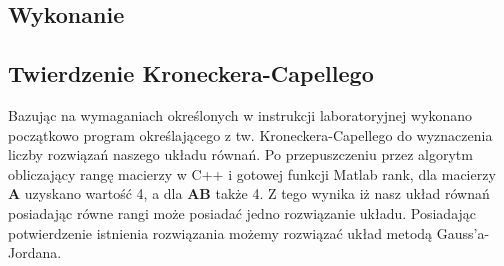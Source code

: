 \documentclass{article}
\begin{document}
\subsection{Wykonanie} 
\subsection{Twierdzenie Kroneckera-Capellego}
Bazując na wymaganiach określonych w instrukcji laboratoryjnej wykonano początkowo program określającego z tw. Kroneckera-Capellego do wyznaczenia liczby rozwiązań naszego układu równań.
Po przepuszczeniu przez algorytm obliczający rangę macierzy w C++ i gotowej funkcji Matlab rank, dla macierzy $\mathbf{A}$ uzyskano wartość 4, a dla $
\mathbf{AB}$ także 4. Z tego wynika iż nasz układ równań posiadając równe rangi może posiadać jedno rozwiązanie układu. Posiadając potwierdzenie istnienia rozwiązania możemy rozwiązać układ metodą Gauss'a-Jordana.\\
\end{document}
